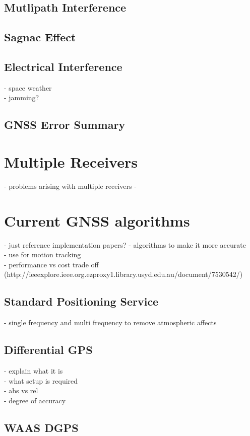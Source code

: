 \subsection{Mutlipath Interference}


\subsection{Sagnac Effect}


\subsection{Electrical Interference}
- space weather\\
- jamming?

\subsection{GNSS Error Summary}


\section{Multiple Receivers}
- problems arising with multiple receivers
- 

\section{Current GNSS algorithms}
- just reference implementation papers?
- algorithms to make it more accurate\\
- use for motion tracking\\
- performance vs cost trade off\\
(http://ieeexplore.ieee.org.ezproxy1.library.usyd.edu.au/document/7530542/)
\subsection{Standard Positioning Service}
- single frequency and multi frequency to remove atmospheric affects
\subsection{Differential GPS}
- explain what it is\\
- what setup is required \\
- abs vs rel \\
- degree of accuracy
\subsection{WAAS DGPS}

